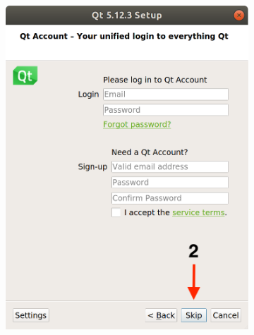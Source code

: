 \begin{figure}[H]
\begin{subfigure}{0.32\linewidth}
        \includegraphics[width=1\textwidth]{Images/Qt2.png}
    \end{subfigure}
    \begin{subfigure}{0.32\linewidth}

\end{subfigure}
\end{figure}
